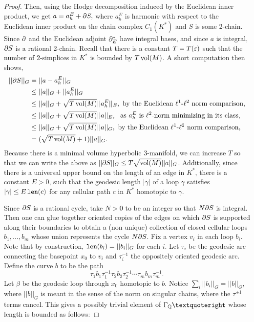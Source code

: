 \begin{proof}
Then, using the Hodge decomposition induced by the Euclidean inner product, we get $a = a_h^E + \partial S,$ where $a_h^E$ is harmonic with respect to the Euclidean inner product on the chain complex $C_1(K^*)$ and $S$ is some 2-chain. Since $\partial$ and the Euclidean adjoint $\partial^*_E$ have integral bases, and since $a$ is integral, $\partial S$ is a rational 2-chain. Recall that there is a constant $T=T(\varepsilon)$ such that the number of 2-simplices in $K^*$ is bounded by $T\operatorname{vol}(M)$. A short computation then shows,
\begin{align*}
||\partial S||_G &= ||a - a_h^E||_G\\
		&\leq ||a||_G+||a_h^E||_G\\
		&\leq ||a||_G+\sqrt{T\operatorname{vol}(M)}||a_h^E||_E, \text{~by the Euclidean $\ell^1$-$\ell^2$ norm comparison,}\\
		&\leq ||a||_G + \sqrt{T\operatorname{vol}(M)}||a||_E, \text{~ as $a_h^E$ is $\ell^2$-norm minimizing in its class},\\
		&\leq ||a||_G + \sqrt{T\operatorname{vol}(M)}||a||_G, \text{~by the Euclidean $\ell^1$-$\ell^2$ norm comparison},\\
		&= (\sqrt{T\operatorname{vol}(M)}+1 )||a||_G.
\end{align*}
Because there is a minimal volume hyperbolic 3-manifold, we can increase $T$ so that we can write the above as $||\partial S||_G\leq T\sqrt{\operatorname{vol}(M)}||a||_G$. Additionally, since there is a universal upper bound on the length of an edge in $K^*$, there is a constant $E>0$, such that the geodesic length $|\gamma|$ of a loop $\gamma$ satisfies $|\gamma|\leq E\operatorname{{\tt{len}}}(c)$ for any cellular path $c$ in $K^*$ homotopic to $\gamma$.

Since $\partial S$ is a rational cycle, take $N>0$ to be an integer so that $N\partial S$ is integral. Then one can glue together oriented copies of the edges on which $\partial S$ is supported along their boundaries to obtain a (non unique) collection of closed cellular loops $b_1,\dots,b_m$ whose union represents the cycle $N\partial S$.  Fix a vertex $v_i$ in each loop $b_i$. Note that by construction, $\operatorname{{\tt{len}}}(b_i) = ||b_i||_G$ for each $i$. Let $\tau_i$ be the geodesic arc connecting the basepoint $x_0$ to $v_i$ and $\tau_i^{-1}$ the oppositely oriented geodesic arc. Define the curve $b$ to be the path $$\tau_1b_1\tau_1^{-1}\tau_2b_2\tau_2^{-1}\cdots \tau_mb_m\tau_m^{-1}.$$
Let $\beta$ be the geodesic loop through $x_0$ homotopic to $b$. Notice $\sum_i ||b_i||_G = ||b||_G$, where $||b||_G$ is meant in the sense of the norm on singular chains, where the $\tau^{\pm 1}$ terms cancel. This gives a possibly trivial element of $\Gamma_\Q’$ whose length is bounded as follows:


\end{proof}
